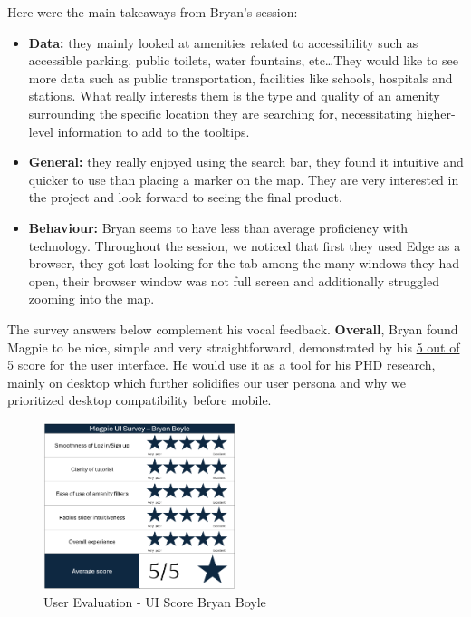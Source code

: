 \newpage Here were the main takeaways from Bryan's session:
\begin{itemize}
    \item \textbf{Data: }they mainly looked at amenities related to accessibility such as accessible parking, public toilets, water fountains, etc\ldots They would like to see more data such as public transportation, facilities like schools, hospitals and stations. What really interests them is the type and quality of an amenity surrounding the specific location they are searching for, necessitating higher-level information to add to the tooltips.\\
    \item \textbf{General: }they really enjoyed using the search bar, they found it intuitive and quicker to use than placing a marker on the map. They are very interested in the project and look forward to seeing the final product.\\
    \item \textbf{Behaviour: } Bryan seems to have less than average proficiency with technology. Throughout the session, we noticed that first they used Edge as a browser, they got lost looking for the tab among the many windows they had open, their browser window was not full screen and additionally struggled zooming into the map.
\end{itemize}
The survey answers below complement his vocal feedback. \textbf{Overall}, Bryan found Magpie to be nice, simple and very straightforward, demonstrated by his \underline{5 out of 5} score for the user interface. He would use it as a tool for his PHD research, mainly on desktop which further solidifies our user persona and why we prioritized desktop compatibility before mobile.
\begin{figure}[h!]
    \centering
    \includegraphics[width=0.5\textwidth]{images/survey-bryan.png}
    \caption{User Evaluation - UI Score Bryan Boyle}
\end{figure}\\

